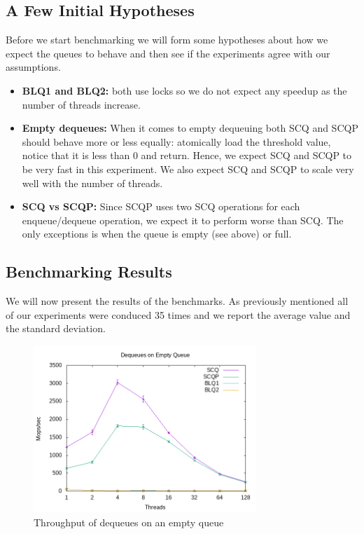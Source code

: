 \documentclass{article}      %
\begin{document}


\subsection{A Few Initial Hypotheses}
\label{sec:initial_theories}
Before we start benchmarking we will form some hypotheses about how we expect the queues to behave and then see if the experiments agree with our assumptions.
\begin{itemize}
	\item \textbf{BLQ1 and BLQ2:} both use locks so we do not expect any speedup as the number of threads increase.
	\item \textbf{Empty dequeues:}  When it comes to empty dequeuing both SCQ and SCQP should behave more or less equally: atomically load the threshold value, notice that it is less than 0 and return. Hence, we expect SCQ and SCQP to be very fast in this experiment. We also expect SCQ and SCQP to scale very well with the number of threads.
	\item \textbf{SCQ vs SCQP:} Since SCQP uses two SCQ operations for each enqueue/dequeue operation, we expect it to perform worse than SCQ. The only exceptions is when the queue is empty (see above) or full.
\end{itemize}

\subsection{Benchmarking Results}
We will now present the results of the benchmarks. As previously mentioned all of our experiments were conduced 35 times and we report the average value and the standard deviation.
\label{sec:bench}
\begin{figure}[hbtp]
	\centering
	\includegraphics[width=0.75\textwidth]{Pictures/tp_deq_empty.png}
	\caption{Throughput of dequeues on an empty queue}
	\label{fig:tp_empty}
\end{figure}
\end{document}
